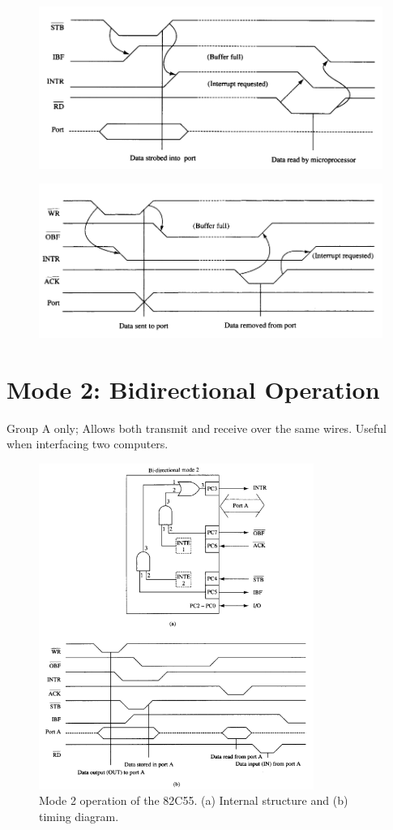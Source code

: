 \begin{figure}[h!]
  \includegraphics[width = 1.2\textwidth]{./figures/Strobed_I.png}
\end{figure}
\begin{figure}[h!]
  \includegraphics[width = 1.2\textwidth]{./figures/Strobed_O.png}
\end{figure}

\section{Mode 2: Bidirectional Operation}
Group A only; Allows both transmit and receive over the same wires. Useful when interfacing two computers.
\begin{figure}[h!]
  \includegraphics[width = 0.8\textwidth]{./figures/Bi_Directional.png}
  \caption{Mode 2 operation of the 82C55. (a) Internal structure and (b) timing diagram.}
\end{figure}
